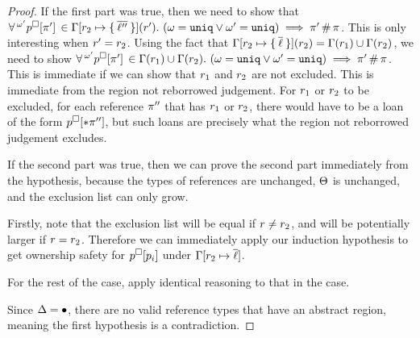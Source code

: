 \begin{proof}
  If the first part was true, then we need to show that $\forall
  \oxloanpkg{\oxmuta^\prime}{\oxplaceexprctx[\oxplace^\prime]} \in
  \oxvarctx[\oxcprov_2 \mapsto
    \oxset{\overline{\oxloan^{\prime\prime}}}](\oxcprov^\prime).\ (\oxmuta =
  \oxmut \vee \oxmuta^\prime = \oxmut) \implies
  \oxrelevant{\oxplace^\prime}{\oxplace}$. This is only interesting when
  $r^\prime = r_2$. Using the fact that $\Gamma[r_2
    \mapsto \{ \: \overline{\ell} \: \}](r_2) = \Gamma(r_1) \cup
  \Gamma(r_2)$, we need to show $\forall
  \,^{\omega^\prime}p^\square[\pi^\prime]\, \in
  \Gamma(r_1) \cup \Gamma(r_2).\ (\omega = \mathtt{uniq} \vee
  \omega^\prime = \mathtt{uniq}) \implies \pi^\prime \, \# \, \pi$.
  This is immediate if we can show that $r_1$ and $r_2$ are not
  excluded. This is immediate from the region not reborrowed judgement. For
  $r_1$ or $r_2$ to be excluded, for each reference
  $\pi^{\prime\prime}$ that has $r_1$ or $r_2$, there would
  have to be a loan of the form $p^\square[* \pi^{\prime\prime}]$, but such loans are precisely what the region not
  reborrowed judgement excludes.

  If the second part was true, then we can prove the second part immediately
  from the hypothesis, because the types of references are unchanged,
  $\Theta$ is unchanged, and the exclusion list can only grow.

  \vspace{1em}
  \noindent \framebox[\textwidth]{ \figuresize
    \begin{mathpar}
      \ODeref
    \end{mathpar}
  } \vspace{1em}

  Firstly, note that the exclusion list will be equal if $r \neq
  r_2$, and will be potentially larger if $r = r_2$.
  Therefore we can immediately apply our induction hypothesis to get ownership
  safety for $p^\square[p_i]$ under
  $\Gamma[r_2 \mapsto \overline{\ell}]$.

  For the rest of the case, apply identical reasoning to that in the
   case.

  \vspace{1em}
  \noindent \framebox[\textwidth]{ \figuresize
    \begin{mathpar}
      \ODerefAbs
    \end{mathpar}
  } \vspace{1em}

  Since $\Delta = \bullet$, there are no valid reference types that have
  an abstract region, meaning the first hypothesis is a contradiction.

\end{proof}

